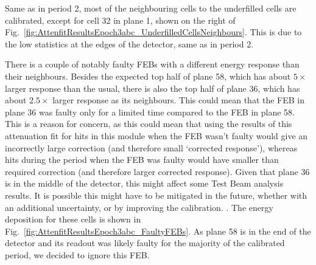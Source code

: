 Same as in period 2, most of the neighbouring cells to the underfilled cells are calibrated, except for cell 32 in plane 1, shown on the right of Fig.~\ref{fig:AttenfitResultsEpoch3abc_UnderfilledCellsNeighbours}. This is due to the low statistics at the edges of the detector, same as in period 2.

There is a couple of notably faulty \gls{FEB}s with a different energy response than their neighbours. Besides the expected top half of plane 58, which has about $5\times$ larger response than the usual, there is also the top half of plane 36, which has about $2.5\times$ larger response as its neighbours. This could mean that the \gls{FEB} in plane 36 was faulty only for a limited time compared to the \gls{FEB} in plane 58. This is a reason for concern, as this could mean that using the results of this attenuation fit for hits in this module when the \gls{FEB} wasn't faulty would give an incorrectly large correction (and therefore small `corrected response'), whereas hits during the period when the \gls{FEB} was faulty would have smaller than required correction (and therefore larger corrected response). Given that plane 36 is in the middle of the detector, this might affect some Test Beam analysis results. It is possible this might have to be mitigated in the future, whether with an additional uncertainty, or by improving the calibration. . The energy deposition for these cells is shown in Fig.~\ref{fig:AttenfitResultsEpoch3abc_FaultyFEBs}. As plane 58 is in the end of the detector and its readout was likely faulty for the majority of the calibrated period, we decided to ignore this \gls{FEB}.

